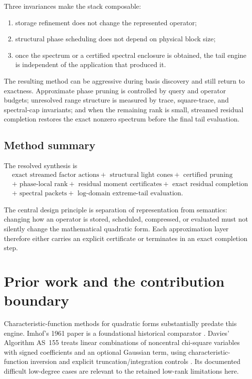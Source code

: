 \documentclass[11pt]{article}
\theoremstyle{definition}
\theoremstyle{remark}
\begin{document}
Three invariances make the stack composable:
\begin{enumerate}
\item storage refinement does not change the represented operator;
\item structural phase scheduling does not depend on physical block size;
\item once the spectrum or a certified spectral enclosure is obtained, the
      tail engine is independent of the application that produced it.
\end{enumerate}

The resulting method can be aggressive during basis discovery and still return
to exactness.  Approximate phase pruning is controlled by query and operator
budgets; unresolved range structure is measured by trace, square-trace, and
spectral-cap invariants; and when the remaining rank is small, streamed
residual completion restores the exact nonzero spectrum before the final tail
evaluation.

\subsection{Method summary}

The resolved synthesis is
\[
\boxed{\begin{aligned}
&\text{exact streamed factor actions}
+\text{ structural light cones}
+\text{ certified pruning}\\
&+\text{ phase-local rank}
+\text{ residual moment certificates}
+\text{ exact residual completion}\\
&+\text{ spectral packets}
+\text{ log-domain extreme-tail evaluation}.
\end{aligned}}
\]

The central design principle is separation of representation from semantics:
changing how an operator is stored, scheduled, compressed, or evaluated must
not silently change the mathematical quadratic form.  Each approximation
layer therefore either carries an explicit certificate or terminates in an
exact completion step.


\section{Prior work and the contribution boundary}\label{sec:prior-work}
Characteristic-function methods for quadratic forms substantially predate
this engine.  Imhof's 1961 paper is a foundational historical comparator
\cite{Imhof1961}.  Davies' Algorithm AS~155 treats linear combinations of
noncentral chi-square variables with signed coefficients and an optional
Gaussian term, using characteristic-function inversion and explicit
truncation/integration controls \cite{Davies1980}.  Its documented difficult
low-degree cases are relevant to the retained low-rank limitations here.
\end{document}
